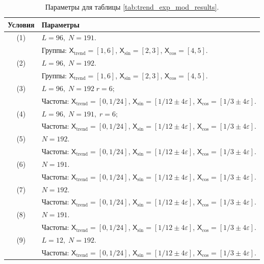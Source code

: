 \documentclass[12pt, specialist, subf
]{disser}
\theoremstyle{definition}
\newcommand{\TS}{\mathsf{X}}
\begin{document}
\begin{table}[H]
  \caption{Параметры для таблицы \ref{tab:trend_exp_mod_results}.}
  \centering
  \label{tab:trend_exp_mod_parameters}
  \begin{tabularx}{\textwidth}{|c|X|}
    \hline
    \textbf{Условия} & \textbf{Параметры} \\
    \hline
    (1)  & \(L = 96,\; N = 191\). \\
         & Группы: \(\TS_{\text{trend}} = [1,6]\), \(\TS_{\sin} = [2,3]\), \(\TS_{\cos} = [4,5]\). \\
    \hline
    (2)  & \(L = 96,\; N = 192\). \\
         & Группы: \(\TS_{\text{trend}} = [1,6]\), \(\TS_{\sin} = [2,3]\), \(\TS_{\cos} = [4,5]\). \\
    \hline
    (3)  & \(L = 96,\; N = 192\;  r= 6;\) \\
         & Частоты: \(\TS_{\text{trend}} = [0,1/24]\), \(\TS_{\sin} = [1/12\pm4\varepsilon]\), \(\TS_{\cos} = [1/3\pm4\varepsilon]\). \\
    \hline
    (4)  & \(L = 96,\; N = 191,\;  r= 6;\) \\
         & Частоты: \(\TS_{\text{trend}} = [0,1/24]\), \(\TS_{\sin} = [1/12\pm4\varepsilon]\), \(\TS_{\cos} = [1/3\pm4\varepsilon]\). \\
    \hline
    (5)  & \(N = 192\). \\
         & Частоты: \(\TS_{\text{trend}} = [0,1/24]\), \(\TS_{\sin} = [1/12\pm4\varepsilon]\), \(\TS_{\cos} = [1/3\pm4\varepsilon]\). \\
    \hline
    (6)  & \(N = 191\). \\
         & Частоты: \(\TS_{\text{trend}} = [0,1/24]\), \(\TS_{\sin} = [1/12\pm4\varepsilon]\), \(\TS_{\cos} = [1/3\pm4\varepsilon]\). \\
    \hline
    (7)  & \(N = 192\). \\
         & Частоты: \(\TS_{\text{trend}} = [0,1/24]\), \(\TS_{\sin} = [1/12\pm4\varepsilon]\), \(\TS_{\cos} = [1/3\pm4\varepsilon]\). \\
    \hline
    (8)  & \(N = 191\). \\
	& Частоты: \(\TS_{\text{trend}} = [0,1/24]\), \(\TS_{\sin} = [1/12\pm4\varepsilon]\), \(\TS_{\cos} = [1/3\pm4\varepsilon]\). \\
    \hline
    (9)  & \(L = 12,\; N = 192\). \\
         & Частоты: \(\TS_{\text{trend}} = [0,1/24]\), \(\TS_{\sin} = [1/12\pm4\varepsilon]\), \(\TS_{\cos} = [1/3\pm4\varepsilon]\). \\

\end{tabularx}
\end{table}
\end{document}
